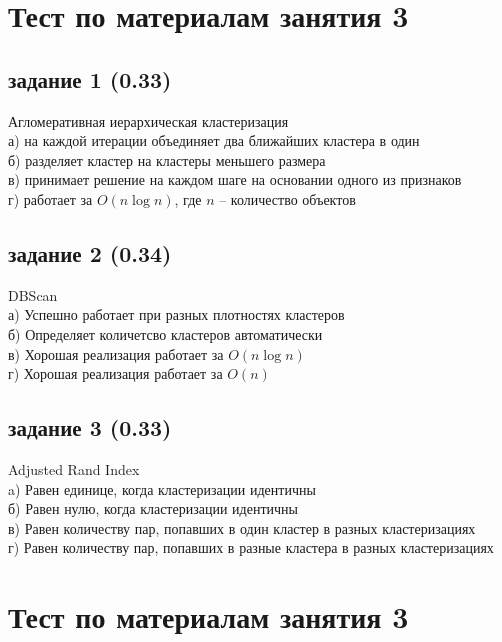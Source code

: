 \documentclass[10pt,a4paper]{article}
\author{Nikolay Anokhin}
\begin{document}
\thispagestyle{empty}

\section*{Тест по материалам занятия 3}

\subsection*{задание 1 (0.33)}

Агломеративная иерархическая кластеризация \\
а) на каждой итерации объединяет два ближайших кластера в один \\
б) разделяет кластер на кластеры меньшего размера \\
в) принимает решение на каждом шаге на основании одного из признаков \\
г) работает за $O(n \log n)$, где $n$ -- количество объектов

\subsection*{задание 2 (0.34)}

DBScan \\
а) Успешно работает при разных плотностях кластеров \\
б) Определяет количетсво кластеров автоматически \\
в) Хорошая реализация работает за $O(n \log n)$ \\
г) Хорошая реализация работает за $O(n)$

\subsection*{задание 3 (0.33)}

Adjusted Rand Index \\
a) Равен единице, когда кластеризации идентичны \\
б) Равен нулю, когда кластеризации идентичны \\
в) Равен количеству пар, попавших в один кластер в разных кластеризациях \\
г) Равен количеству пар, попавших в разные кластера в разных кластеризациях

\vspace{5em}

\section*{Тест по материалам занятия 3}
\end{document}
